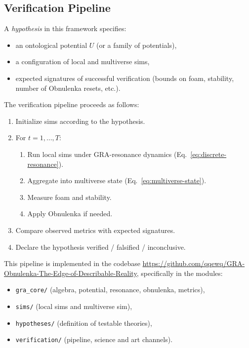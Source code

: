 \documentclass[11pt,a4paper]{article}
\begin{document}
\subsection{Verification Pipeline}
A \emph{hypothesis} in this framework specifies:
\begin{itemize}
  \item an ontological potential $U$ (or a family of potentials),
  \item a configuration of local and multiverse sims,
  \item expected signatures of successful verification
        (bounds on foam, stability, number of Obnulenka resets, etc.).
\end{itemize}

The verification pipeline proceeds as follows:
\begin{enumerate}
  \item Initialize sims according to the hypothesis.
  \item For $t = 1, \dots, T$:
    \begin{enumerate}
      \item Run local sims under GRA-resonance dynamics
            (Eq.~\eqref{eq:discrete-resonance}).
      \item Aggregate into multiverse state (Eq.~\eqref{eq:multiverse-state}).
      \item Measure foam and stability.
      \item Apply Obnulenka if needed.
    \end{enumerate}
  \item Compare observed metrics with expected signatures.
  \item Declare the hypothesis verified / falsified / inconclusive.
\end{enumerate}

This pipeline is implemented in the codebase
\url{https://github.com/qqewq/GRA-Obnulenka-The-Edge-of-Describable-Reality},
specifically in the modules:
\begin{itemize}
  \item \texttt{gra\_core/} (algebra, potential, resonance, obnulenka, metrics),
  \item \texttt{sims/} (local sims and multiverse sim),
  \item \texttt{hypotheses/} (definition of testable theories),
  \item \texttt{verification/} (pipeline, science and art channels).
\end{itemize}
\end{document}
